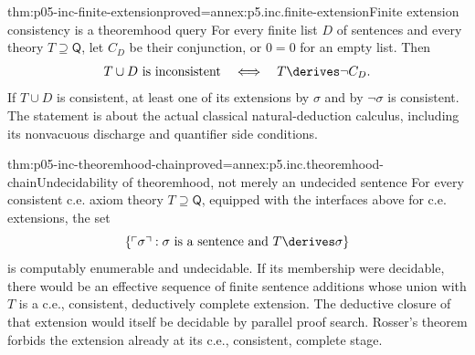 \begin{hblemma}{thm:p05-inc-finite-extension}{proved=annex:p5.inc.finite-extension}{Finite extension consistency is a theoremhood query}
For every finite list \(D\) of sentences and every theory
\(T\supseteq\mathsf Q\), let \(C_D\) be their conjunction, or
\(0=0\) for an empty list. Then
\[
 T\cup D\text{ is inconsistent}
 \quad\Longleftrightarrow\quad T\derives\neg C_D.
\]
If \(T\cup D\) is consistent, at least one of its extensions by
\(\sigma\) and by \(\neg\sigma\) is consistent. The statement is
about the actual classical natural-deduction calculus, including its
nonvacuous discharge and quantifier side conditions.
\end{hblemma}

\begin{hbtheorem}{thm:p05-inc-theoremhood-chain}{proved=annex:p5.inc.theoremhood-chain}{Undecidability of theoremhood, not merely an undecided sentence}
For every consistent c.e. axiom theory \(T\supseteq\mathsf Q\),
equipped with the interfaces above for c.e. extensions, the set
\[
 \{\ulcorner\sigma\urcorner:\sigma\text{ is a sentence and }
                                    T\derives\sigma\}
\]
is computably enumerable and undecidable. If its membership were decidable,
there would be an effective sequence of finite sentence additions whose
union with \(T\) is a c.e., consistent, deductively complete extension.
The deductive closure of that extension would itself be decidable by
parallel proof search. Rosser's theorem forbids the extension already
at its c.e., consistent, complete stage.
\end{hbtheorem}


